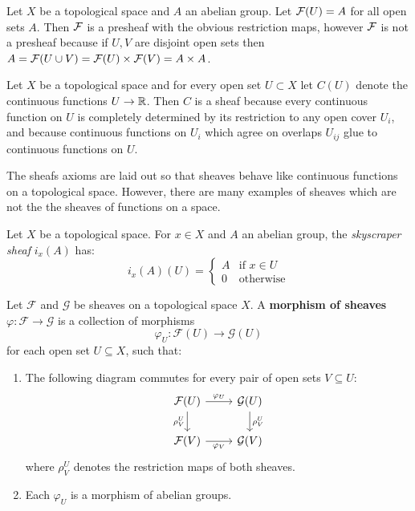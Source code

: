 \documentclass[12pt]{article}
\begin{document}
\begin{example}
    Let $X$ be a topological space and $A$ an abelian group. Let ${\mathcal{F}}(U) = A$ for all open sets $A$. Then ${\mathcal{F}}$ is a presheaf with the obvious restriction maps, however ${\mathcal{F}}$ is not a presheaf because if $U,V$ are disjoint open sets then $A = {\mathcal{F}}(U \cup V) = {\mathcal{F}}(U)\times {\mathcal{F}}(V) = A\times A$.
\end{example}

\begin{example}
    Let $X$ be a topological space and for every open set $U\subset X$ let $C(U)$ denote the continuous functions $U\to \mathbb{R}$. Then $C$ is a sheaf because every continuous function on $U$ is completely determined by its restriction to any open cover $U_i$, and because continuous functions on $U_i$ which agree on overlaps $U_{ij}$ glue to continuous functions on $U$.
\end{example}

The sheafs axioms are laid out so that sheaves behave like continuous functions on a topological space. However, there are many examples of sheaves which are not the the sheaves of functions on a space.

\begin{example}
    Let $X$ be a topological space. For $x \in X$ and $A$ an abelian group, the \emph{skyscraper sheaf} $i_x(A)$ has:
    \[
        i_x(A)(U) =
        \begin{cases}
            A & \text{if } x \in U \\
            0 & \text{otherwise}
        \end{cases}
    \]
\end{example}

\begin{definition}
    Let $\mathcal{F}$ and $\mathcal{G}$ be sheaves on a topological space $X$. A \textbf{morphism of sheaves} $\varphi: \mathcal{F} \to \mathcal{G}$ is a collection of morphisms
    \[
        \varphi_U: \mathcal{F}(U) \to \mathcal{G}(U)
    \]
    for each open set $U \subseteq X$, such that:
    \begin{enumerate}
        \item The following diagram commutes for every pair of open sets $V \subseteq U$:
              \[
                  \begin{tikzcd}
                      \mathcal{F}(U) \ar[r, "\varphi_U"] \ar[d, "\rho^U_V"'] & \mathcal{G}(U) \ar[d, "\rho^U_V"] \\
                      \mathcal{F}(V) \ar[r, "\varphi_V"'] & \mathcal{G}(V)
                  \end{tikzcd}
              \]
              where $\rho^U_V$ denotes the restriction maps of both sheaves.

        \item Each $\varphi_U$ is a morphism of abelian groups.
    \end{enumerate}
\end{definition}
\end{document}
